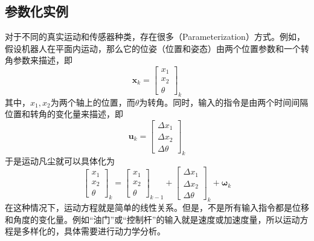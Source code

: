 \subsection{参数化实例}
对于不同的真实运动和传感器种类，存在很多（Parameterization）方式。例如，假设机器人在平面内运动，那么它的位姿（位置和姿态）由两个位置参数和一个转角参数来描述，即
\begin{equation}
    \bm{x}_k = 
    \begin{bmatrix}
        x_1 \\
        x_2 \\
        \theta
    \end{bmatrix}_k
\end{equation}
其中，$x_1,x_2$为两个轴上的位置，而$\theta$为转角。同时，输入的指令是由两个时间间隔位置和转角的变化量来描述，即
\begin{equation}
    \bm{u}_k =
    \begin{bmatrix}
        \Delta x_1 \\
        \Delta x_2 \\
        \Delta \theta
    \end{bmatrix}_k
\end{equation}
于是运动凡尘就可以具体化为
\begin{equation}
    \begin{bmatrix}
        x_1 \\
        x_2 \\
        \theta
    \end{bmatrix}_k
    =
    \begin{bmatrix}
        x_1 \\
        x_2 \\
        \theta
    \end{bmatrix}_{k-1}
    +
    \begin{bmatrix}
        \Delta x_1 \\
        \Delta x_2 \\
        \Delta \theta
    \end{bmatrix}_k
    + \bm{\omega}_k
\end{equation}
在这种情况下，运动方程就是简单的线性关系。但是，不是所有输入指令都是位移和角度的变化量。例如“油门”或“控制杆”的输入就是速度或加速度量，所以运动方程是多样化的，具体需要进行动力学分析。

